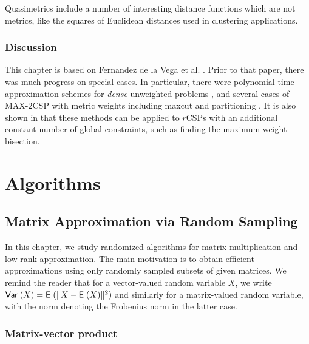 \documentclass{book}
\numberwithin{exercise}{chapter}
\begin{document}
Quasimetrics include a number of interesting
distance functions which are not metrics,
like the squares of Euclidean distances used in
clustering applications.



\section{Discussion}
This chapter is based on Fernandez de la Vega et al. \cite{FKKV05}.
Prior to that paper,
there was much progress on special cases. In particular, there
were polynomial-time approximation schemes for {\em dense} unweighted
problems \cite{AKK95, F96, FK96, GGR98,FK99,AFKK02},
and several cases of MAX-$2$CSP with metric weights including
maxcut and partitioning \cite{FK98, I99, FKKR03,
FKK04}. It is also shown in \cite{FKKV05} that these methods can be applied to $r$CSPs with an additional constant number of global constraints, such as finding the maximum weight bisection.


\part{Algorithms}




\chapter{Matrix Approximation via Random Sampling}\label{chap:mm}

In this chapter, we study randomized algorithms for matrix multiplication and low-rank approximation. The main motivation is to obtain efficient approximations using only randomly sampled subsets of given matrices. We remind the reader that for a vector-valued random variable $X$, we write
$\hbox{\sf Var\;}(X)= \hbox{{\sf E}\;}(\|X-\hbox{{\sf E}\;}(X)\|^2)$ and similarly for a matrix-valued random variable, with the norm denoting the Frobenius norm in the latter case.

\section{Matrix-vector product}
\end{document}
